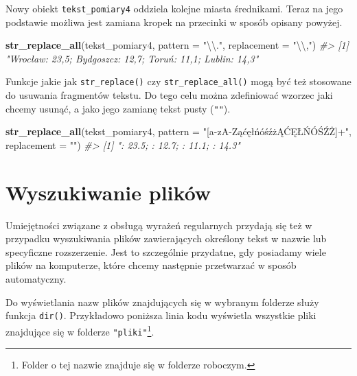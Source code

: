 \documentclass[paper=6in:9in,pagesize=pdftex,headinclude=on,footinclude=on,10pt]{scrbook}
\newenvironment{Shaded}{\begin{snugshade}}{\end{snugshade}}
\newcommand{\CharTok}[1]{\textcolor[rgb]{0.31,0.60,0.02}{#1}}
\newcommand{\CommentTok}[1]{\textcolor[rgb]{0.56,0.35,0.01}{\textit{#1}}}
\newcommand{\DataTypeTok}[1]{\textcolor[rgb]{0.13,0.29,0.53}{#1}}
\newcommand{\KeywordTok}[1]{\textcolor[rgb]{0.13,0.29,0.53}{\textbf{#1}}}
\newcommand{\NormalTok}[1]{#1}
\newcommand{\StringTok}[1]{\textcolor[rgb]{0.31,0.60,0.02}{#1}}
\begin{document}
Nowy obiekt \texttt{tekst\_pomiary4} oddziela kolejne miasta średnikami.
Teraz na jego podstawie możliwa jest zamiana kropek na przecinki w sposób opisany powyżej.

\begin{Shaded}
\begin{Highlighting}[]
\KeywordTok{str_replace_all}\NormalTok{(tekst_pomiary4, }
                \DataTypeTok{pattern =} \StringTok{"}\CharTok{\textbackslash{}\textbackslash{}}\StringTok{."}\NormalTok{, }
                \DataTypeTok{replacement =} \StringTok{"}\CharTok{\textbackslash{}\textbackslash{}}\StringTok{,"}\NormalTok{)}
\CommentTok{#> [1] "Wrocław: 23,5; Bydgoszcz: 12,7; Toruń: 11,1; Lublin: 14,3"}
\end{Highlighting}
\end{Shaded}

Funkcje jakie jak \texttt{str\_replace()} czy \texttt{str\_replace\_all()} mogą być też stosowane do usuwania fragmentów tekstu.
Do tego celu można zdefiniować wzorzec jaki chcemy usunąć, a jako jego zamianę tekst pusty (\texttt{""}).

\begin{Shaded}
\begin{Highlighting}[]
\KeywordTok{str_replace_all}\NormalTok{(tekst_pomiary4, }
                \DataTypeTok{pattern =} \StringTok{"[a-zA-ZąćęłńóśźżĄĆĘŁŃÓŚŹŻ]+"}\NormalTok{,}
                \DataTypeTok{replacement =} \StringTok{""}\NormalTok{)}
\CommentTok{#> [1] ": 23.5; : 12.7; : 11.1; : 14.3"}
\end{Highlighting}
\end{Shaded}

\hypertarget{wyszukiwanie-plikow}{%
\section{Wyszukiwanie plików}\label{wyszukiwanie-plikow}}

Umiejętności związane z obsługą wyrażeń regularnych przydają się też w przypadku wyszukiwania plików zawierających określony tekst w nazwie lub specyficzne rozszerzenie.
Jest to szczególnie przydatne, gdy posiadamy wiele plików na komputerze, które chcemy następnie przetwarzać w sposób automatyczny.

Do wyświetlania nazw plików znajdujących się w wybranym folderze służy funkcja \texttt{dir()}.
Przykładowo poniższa linia kodu wyświetla wszystkie pliki znajdujące się w folderze \texttt{"pliki"}\footnote{Folder o tej nazwie znajduje się w folderze roboczym.}.
\end{document}
